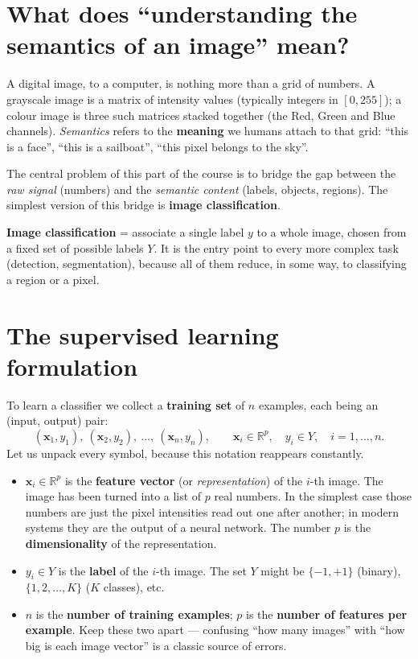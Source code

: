 \documentclass{report}
\newcommand{\R}{\mathbb{R}}
\newcommand{\xvec}{\mathbf{x}}
\begin{document}
\section{What does ``understanding the semantics of an image'' mean?}

A digital image, to a computer, is nothing more than a grid of numbers. A
grayscale image is a matrix of intensity values (typically integers in
$[0,255]$); a colour image is three such matrices stacked together (the Red,
Green and Blue channels). \emph{Semantics} refers to the \textbf{meaning} we
humans attach to that grid: ``this is a face'', ``this is a sailboat'', ``this
pixel belongs to the sky''.

The central problem of this part of the course is to bridge the gap between
the \emph{raw signal} (numbers) and the \emph{semantic content} (labels,
objects, regions). The simplest version of this bridge is \textbf{image
classification}.

\begin{keybox}
\textbf{Image classification} = associate a single label $y$ to a whole image,
chosen from a fixed set of possible labels $Y$. It is the entry point to every
more complex task (detection, segmentation), because all of them reduce, in
some way, to classifying a region or a pixel.
\end{keybox}

\section{The supervised learning formulation}

To learn a classifier we collect a \textbf{training set} of $n$ examples, each
being an (input, output) pair:
\[
(\xvec_1, y_1),\ (\xvec_2,y_2),\ \dots,\ (\xvec_n,y_n),
\qquad
\xvec_i \in \R^p,\quad y_i \in Y,\quad i = 1,\dots,n.
\]
Let us unpack every symbol, because this notation reappears constantly.

\begin{itemize}
\item $\xvec_i \in \R^p$ is the \textbf{feature vector} (or \emph{representation})
of the $i$-th image. The image has been turned into a list of $p$ real numbers.
In the simplest case those numbers are just the pixel intensities read out one
after another; in modern systems they are the output of a neural network. The
number $p$ is the \textbf{dimensionality} of the representation.

\item $y_i \in Y$ is the \textbf{label} of the $i$-th image. The set $Y$ might
be $\{-1,+1\}$ (binary), $\{1,2,\dots,K\}$ ($K$ classes), etc.

\item $n$ is the \textbf{number of training examples}; $p$ is the
\textbf{number of features per example}. Keep these two apart --- confusing
``how many images'' with ``how big is each image vector'' is a classic source
of errors.
\end{itemize}
\end{document}
